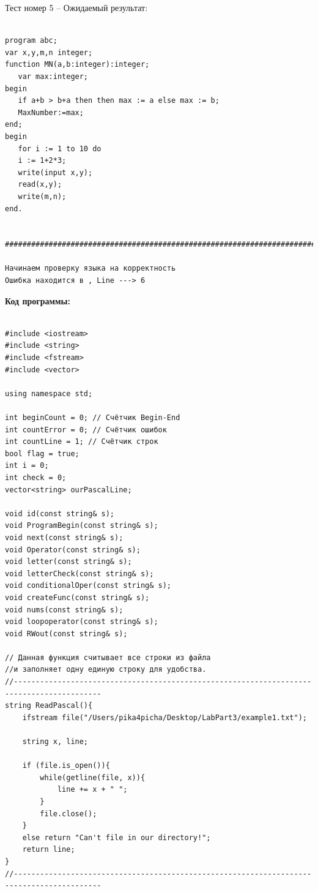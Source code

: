 \documentclass[12pt]{article}
\begin{document}
Тест номер 5 -- Ожидаемый результат:\\
\begin{verbatim}

program abc;
var x,y,m,n integer;
function MN(a,b:integer):integer;
   var max:integer;
begin
   if a+b > b+a then then max := a else max := b;
   MaxNumber:=max;
end;
begin
   for i := 1 to 10 do
   i := 1+2*3;
   write(input x,y);
   read(x,y);
   write(m,n);
end.


#########################################################################

Начинаем проверку языка на корректность
Ошибка находится в , Line ---> 6
\end{verbatim}
\hline

\textbf{Код программы:}

\begin{verbatim}

#include <iostream>
#include <string>
#include <fstream>
#include <vector>

using namespace std;

int beginCount = 0; // Счётчик Begin-End
int countError = 0; // Счётчик ошибок
int countLine = 1; // Счётчик строк
bool flag = true;
int i = 0;
int check = 0;
vector<string> ourPascalLine;

void id(const string& s);
void ProgramBegin(const string& s);
void next(const string& s);
void Operator(const string& s);
void letter(const string& s);
void letterCheck(const string& s);
void conditionalOper(const string& s);
void createFunc(const string& s);
void nums(const string& s);
void loopoperator(const string& s);
void RWout(const string& s);

// Данная функция считывает все строки из файла 
//и заполняет одну единую строку для удобства.
//------------------------------------------------------------------------------------------
string ReadPascal(){
    ifstream file("/Users/pika4picha/Desktop/LabPart3/example1.txt");

    string x, line;

    if (file.is_open()){
        while(getline(file, x)){
            line += x + " ";
        }
        file.close();
    }
    else return "Can't file in our directory!";
    return line;
}
//------------------------------------------------------------------------------------------


\end{verbatim}
\end{document}
